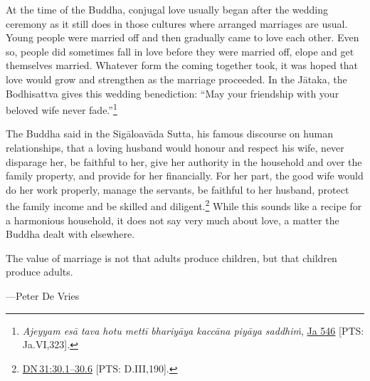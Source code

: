 \documentclass[10pt, openright]{book}
\newenvironment{epigram-2}%
{%
\vspace{1em}
\noindent
\quoting[leftmargin=2.5cm,rightmargin=2.5cm]%
\begin{itshape}
\large
}%
{\end{itshape}\endquoting
}%
\newenvironment{epigram-2-cite}%
{%
\quoting[leftmargin=2.5cm,rightmargin=2.5cm]%
\noindent\normal\hspace*{\fill} 
}%
{\endquoting\vspace{1em}
}%
\begin{document}
At the time of the Buddha, conjugal love usually began after the wedding ceremony as it still does in those cultures where arranged marriages are usual. Young people were married off and then gradually came to love each other. Even so, people did sometimes fall in love before they were married off, elope and get themselves married. Whatever form the coming together took, it was hoped that love would grow and strengthen as the marriage proceeded. In the Jātaka, the Bodhisattva gives this wedding benediction: “May your friendship with your beloved wife never fade.”\footnote {\textit{Ajeyyam esā tava hotu mettī bhariyāya kaccāna piyāya saddhiṁ}, \href{https://suttacentral.net/ja546/en/cowell-rouse?reference=main/pts#pts-vp-pli323}{Ja 546} [PTS: Ja.VI,323].}


The Buddha said in the Sigāloavāda Sutta, his famous discourse on human relationships, that a loving husband would honour and respect his wife, never disparage her, be faithful to her, give her authority in the household and over the family property, and provide for her financially. For her part, the good wife would do her work properly, manage the servants, be faithful to her husband, protect the family income and be skilled and diligent.\footnote {\href{https://suttacentral.net/dn31/en/sujato\#30.1}{DN 31:30.1–30.6} [PTS: D.III,190].} While this sounds like a recipe for a harmonious household, it does not say very much about love, a matter the Buddha dealt with elsewhere.


\begin{epigram-2}
The value of marriage is not that adults produce children, but that children produce adults.
\end{epigram-2}

\begin{epigram-2-cite}
—Peter De Vries
\end{epigram-2-cite}
\end{document}
